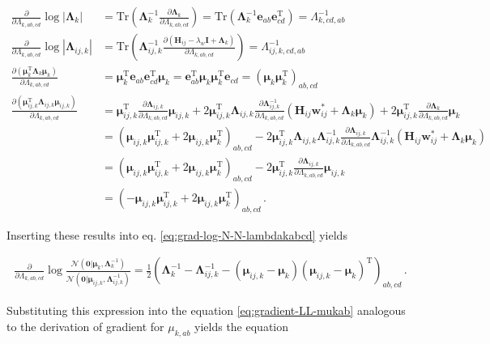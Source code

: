 \documentclass[12pt,a4paper,twoside]{book}
\newcommand{\Gauss}{\mathcal{N}}
\renewcommand{\H}{\mathbf{H}}
\newcommand{\Hij}{\H_{ij}}
\newcommand{\I}{\mathbf{I}}
\newcommand{\Lijk}{\mathbf{\Lambda}_{ij,k}}
\newcommand{\Lk}{\mathbf{\Lambda}_k}
\newcommand{\muijk}{\mathbf{\mu}_{ij,k}}
\newcommand{\muk}{\mathbf{\mu}_k}
\newcommand{\wij}{\mathbf{w}_{ij}}
\theoremstyle{definition}
\theoremstyle{definition}
\theoremstyle{remark}
\begin{document}
\begin{align}
\frac{\partial}{\partial \Lambda_{k,ab,cd}}  \log |\Lk|
     &= \text{Tr} \left( \Lk^{-1} \frac{\partial \Lk}{\partial \Lambda_{k,ab,cd}} \right) 
     = \text{Tr} \left( \Lk^{-1} \mathbf{e}_{ab} \mathbf{e}_{cd}^\mathrm{T} \right) 
     = \Lambda^{-1}_{k,cd,ab} \\
\frac{\partial}{\partial \Lambda_{k,ab,cd}}  \log |\Lijk|
     &= \text{Tr} \left( \Lijk^{-1} \frac{\partial (\H_{ij} - \lambda_w \I + \Lk)}{\partial \Lambda_{k,ab,cd}}   \right) 
     = \Lambda^{-1}_{ij,k,cd,ab} \\
\frac{\partial (\muk^\mathrm{T} \Lk \muk)}{\partial \Lambda_{k,ab,cd}} 
    &= \muk^\mathrm{T} \mathbf{e}_{ab} \mathbf{e}_{cd}^\mathrm{T} \muk 
    = \mathbf{e}_{ab}^\mathrm{T} \muk \muk^\mathrm{T} \mathbf{e}_{cd} = (\muk \muk^\mathrm{T})_{ab,cd} \\
\frac{\partial ( \muijk^\mathrm{T} \Lijk \muijk) }{\partial \Lambda_{k,ab,cd}} 
    &= \muijk^\mathrm{T} \frac{\partial \Lijk}{\partial \Lambda_{k,ab,cd}} \muijk 
    + 2 \muijk^\mathrm{T} \Lijk \frac{\partial \Lijk^{-1}}{\partial \Lambda_{k,ab,cd}}  (\Hij \wij^* + \Lk \muk) 
    + 2 \muijk^\mathrm{T} \frac{\partial \Lk}{\partial \Lambda_{k,ab,cd}} \muk \nonumber \\
    &= (\muijk \muijk^\mathrm{T} + 2 \muijk \muk^\mathrm{T})_{ab,cd} 
    - 2 \muijk^\mathrm{T} \Lijk  \Lijk^{-1} \frac{\partial \Lijk}{\partial \Lambda_{k,ab,cd}} \Lijk^{-1} (\Hij\wij^* + \Lk \muk) \\
    &= (\muijk \muijk^\mathrm{T} + 2 \muijk \muk^\mathrm{T})_{ab,cd} 
    - 2 \muijk^\mathrm{T}  \frac{\partial \Lijk}{\partial \Lambda_{k,ab,cd}} \muijk\\
    &= (- \muijk \muijk^\mathrm{T} + 2 \muijk \muk^\mathrm{T})_{ab,cd} \,.
\end{align}

Inserting these results into eq. \eqref{eq:grad-log-N-N-lambdakabcd}
yields

\begin{align}
     \frac{\partial}{\partial \Lambda_{k,ab,cd}} \log \frac{  \Gauss(\mathbf{0} | \muk, \Lk^{-1})}{\Gauss( \mathbf{0} | \muijk, \Lijk^{-1})} 
    = \frac{1}{2} \left( \Lk^{-1} - \Lijk^{-1} - (\muijk - \muk) (\muijk - \muk)^\mathrm{T} \right)_{ab,cd}\,.
\end{align}

Substituting this expression into the equation
\eqref{eq:gradient-LL-mukab} analogous to the derivation of gradient for
\(\mu_{k,ab}\) yields the equation
\end{document}
